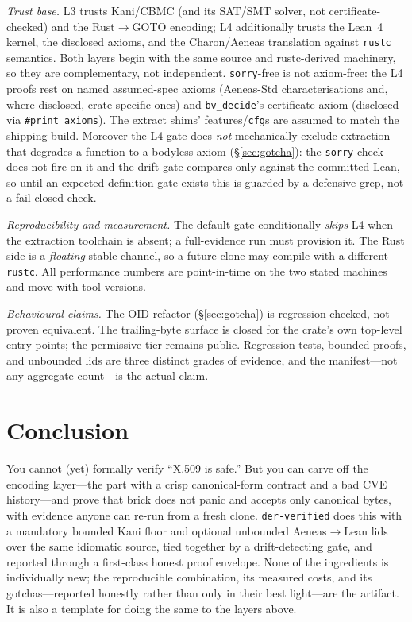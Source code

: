 \documentclass[10pt,twocolumn]{article}
\newcommand{\code}[1]{\texttt{\small #1}}
\newcommand{\crate}{\code{der-verified}}
\begin{document}
\emph{Trust base.} L3 trusts Kani/CBMC (and its SAT/SMT solver, not certificate-
checked) and the Rust${\to}$GOTO encoding; L4 additionally trusts the Lean~4
kernel, the disclosed axioms, and the Charon/Aeneas translation against
\code{rustc} semantics. Both layers begin with the same source and rustc-derived
machinery, so they are complementary, not independent. \code{sorry}-free is not
axiom-free: the L4 proofs rest on named assumed-spec axioms (Aeneas-Std
characterisations and, where disclosed, crate-specific ones) and
\code{bv\_decide}'s certificate axiom (disclosed via \code{\#print axioms}). The
extract shims' features/\code{cfg}s are assumed to match the shipping build.
Moreover the L4 gate does \emph{not} mechanically exclude extraction that
degrades a function to a bodyless axiom (\S\ref{sec:gotcha}): the \code{sorry}
check does not fire on it and the drift gate compares only against the committed
Lean, so until an expected-definition gate exists this is guarded by a defensive
grep, not a fail-closed check.

\emph{Reproducibility and measurement.} The default gate conditionally
\emph{skips} L4 when the extraction toolchain is absent; a full-evidence run
must provision it. The Rust side is a \emph{floating} stable channel, so a
future clone may compile with a different \code{rustc}. All performance numbers
are point-in-time on the two stated machines and move with tool versions.

\emph{Behavioural claims.} The OID refactor (\S\ref{sec:gotcha}) is
regression-checked, not proven equivalent. The trailing-byte surface is closed
for the crate's own top-level entry points; the permissive tier remains public.
Regression tests, bounded proofs, and unbounded lids are three distinct grades
of evidence, and the manifest---not any aggregate count---is the actual claim.

\section{Conclusion}

You cannot (yet) formally verify ``X.509 is safe.'' But you can carve off the
encoding layer---the part with a crisp canonical-form contract and a bad CVE
history---and prove that brick does not panic and accepts only canonical
bytes, with evidence anyone can re-run from a fresh clone. \crate{} does this
with a mandatory bounded Kani floor and optional unbounded Aeneas${\to}$Lean
lids over the same idiomatic source, tied together by a drift-detecting gate,
and reported through a first-class honest proof envelope. None of the
ingredients is individually new; the reproducible combination, its measured
costs, and its gotchas---reported honestly rather than only in their best
light---are the artifact. It is also a template for doing the same to the
layers above.
\end{document}

